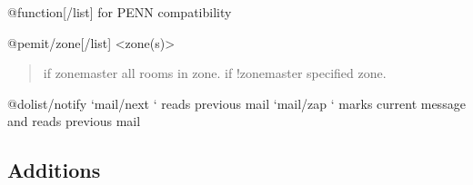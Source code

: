 \documentclass[letterpaper,10pt,english]{sphinxmanual}
\begin{document}
\sphinxAtStartPar
@function{[}/list{]} \sphinxhyphen{} for PENN compatibility

\sphinxAtStartPar
@pemit/zone{[}/list{]} \textless{}zone(s)\textgreater{}
\begin{quote}

\sphinxAtStartPar
if zonemaster \sphinxhyphen{} all rooms in zone.
if !zonemaster \sphinxhyphen{} specified zone.
\end{quote}

\sphinxAtStartPar
@dolist/notify
‘mail/next \sphinxhyphen{}‘ \sphinxhyphen{} reads previous mail
‘mail/zap \sphinxhyphen{}‘ \sphinxhyphen{} marks current message and reads previous mail


\subsection{Additions}
\label{\detokenize{changelog:id84}}
\end{document}

